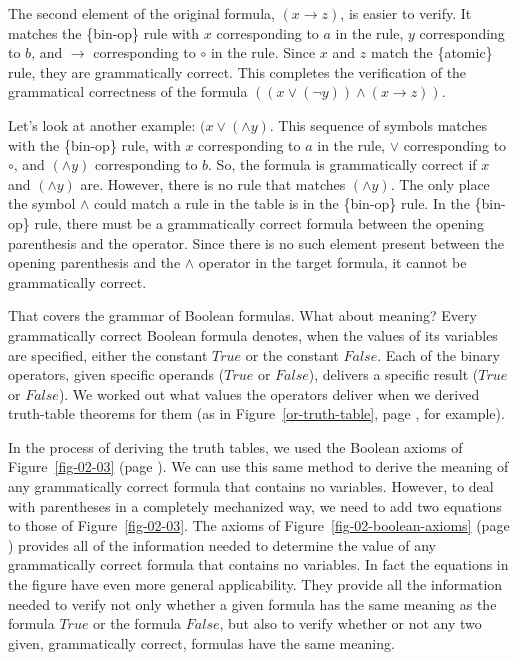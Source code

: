 The second element of the original formula,
$(x \rightarrow z)$, is easier to verify.
It matches the \{bin-op\} rule with $x$ corresponding to $a$ in the rule,
$y$ corresponding to $b$, and $\rightarrow$ corresponding to $\circ$ in the rule.
Since $x$ and $z$ match the \{atomic\} rule, they are grammatically correct.
This completes the verification of the grammatical
correctness of the formula $((x \vee (\neg y)) \wedge (x \rightarrow z))$.

Let's look at another example: $(x \vee (\wedge y)$. 
This sequence of symbols matches with the \{bin-op\} rule, 
with $x$ corresponding to $a$ in the rule, 
$\vee$ corresponding to $\circ$, 
and $(\wedge y)$ corresponding to $b$. 
So, the formula is grammatically correct 
if $x$ and $(\wedge y)$ are. 
However, there is no rule that matches $(\wedge y)$. 
The only place the symbol $\wedge$ could match a rule 
in the table is in the \{bin-op\} rule. 
In the \{bin-op\} rule, there must be 
a grammatically correct formula between 
the opening parenthesis and the operator. 
Since there is no such element present 
between the opening parenthesis 
and the $\wedge$ operator in the target formula, 
it cannot be grammatically correct.

That covers the grammar of Boolean formulas. 
What about meaning? 
Every grammatically correct Boolean formula denotes, 
when the values of its variables are specified, 
either the constant $True$ or the constant $False$. 
Each of the binary operators, given specific operands ($True$ or $False$), 
delivers a specific result ($True$ or $False$). 
We worked out what values the operators deliver 
when we derived truth-table theorems for them 
(as in Figure~\ref{or-truth-table}, page \pageref{or-truth-table}, for example).

In the process of deriving the truth tables,
we used the Boolean axioms of 
Figure~\ref{fig-02-03} (page \pageref{fig-02-03}).
We can use this same method to derive the meaning 
of any grammatically correct formula that contains no variables. 
However, to deal with parentheses in a completely mechanized way, 
we need to add two equations to those of Figure~\ref{fig-02-03}. 
The axioms of Figure~\ref{fig-02-boolean-axioms} (page \pageref{fig-02-boolean-axioms})
provides all of the information needed to determine 
the value of any grammatically correct formula 
that contains no variables. 
In fact the equations in the figure have even more general applicability. 
They provide all the information needed 
to verify not only whether a given formula 
has the same meaning as the formula $True$ or the formula $False$, 
but also to verify whether or not any two given, 
grammatically correct, formulas have the same meaning.


